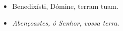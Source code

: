 \begin{paracol}{2}
  \begin{itemize}
    \item[\Antiphona] Benedixísti, Dómine, terram tuam.
      \switchcolumn
    \item[\Antiphona] \emph{Abençoastes, ó Senhor, vossa terra.}
  \end{itemize}
\end{paracol}